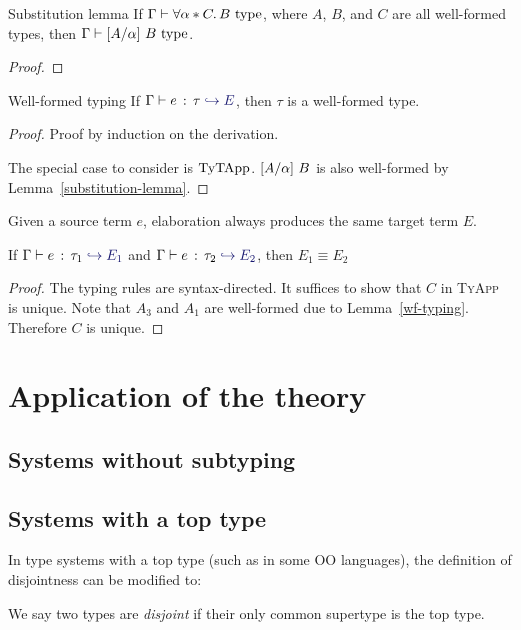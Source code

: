 \documentclass[preprint]{sigplanconf}
\begin{document}
\begin{lemma}{Substitution lemma} \label{substitution-lemma}
If $\Gamma \vdash \forall \alpha * C.\, B \ \text{type}$, where $A$, $B$, and $C$ are all well-formed types, then $\Gamma \vdash \lbrack A / \alpha \rbrack~ B \ \text{type}$.
\end{lemma}

\begin{proof}
\end{proof}

\begin{lemma}{Well-formed typing} \label{wf-typing}
If $\hastype \Gamma e \tau \yields E$, then $\tau$ is a well-formed type.
\end{lemma}

\begin{proof}
Proof by induction on the derivation.

The special case to consider is $\text{TyTApp}$. $\lbrack A / \alpha \rbrack~ B$ is also well-formed by Lemma~\ref{substitution-lemma}.
\end{proof}

Given a source term $e$, elaboration always produces the same target term $E$.

\begin{theorem} \label{unique-elaboration}
If $\hastype \Gamma e {\tau_1} \yields {E_1}$ and $\hastype \Gamma e {\tau_2} \yields {E_2}$, then $E_1 \equiv E_2$
\end{theorem}

\begin{proof}
The typing rules are syntax-directed. It suffices to show that $C$ in \textsc{TyApp} is unique. Note that $A_3$ and $A_1$ are well-formed due to Lemma~\ref{wf-typing}. Therefore $C$ is unique.
\end{proof}

\section{Application of the theory}

\subsection{Systems without subtyping}

\subsection{Systems with a top type}

In type systems with a top type (such as \lstinline@Object@ in some OO languages), the definition of disjointness can be modified to:

We say two types are \emph{disjoint} if their only common supertype is the top type.
\end{document}
